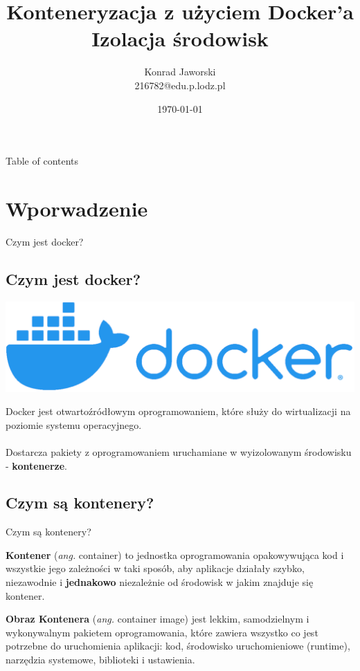 \documentclass[aspectratio=169]{beamer}
\title{Konteneryzacja z użyciem \textbf{Docker}'a \\Izolacja środowisk}
\date{\today}
\author[Jaworski]{Konrad Jaworski\\216782@edu.p.lodz.pl}
\begin{document}
\begin{frame}
    \titlepage
\end{frame}

\begin{frame}{Table of contents}
    \begin{card}
        \tableofcontents
    \end{card}
\end{frame}

\section{Wporwadzenie}
\begin{frame}{Czym jest docker?}\subsection{Czym jest docker?}

    \centering
    \includegraphics[scale=0.2]{img/logo.png}
    \bigskip

    \begin{card}
        Docker jest otwartoźródłowym oprogramowaniem, które służy do wirtualizacji na poziomie systemu operacyjnego.\\\\
        Dostarcza pakiety z oprogramowaniem uruchamiane w wyizolowanym środowisku - \textbf{kontenerze}.
    \end{card}
\end{frame}




\subsection{Czym są kontenery?}
\begin{frame}{Czym są kontenery?}
    \begin{card}
        \textbf{Kontener} (\textit{ang.} container) to jednostka oprogramowania opakowywująca kod i wszystkie jego zależności w taki sposób, aby aplikacje działały szybko, niezawodnie i \textbf{jednakowo} niezależnie od środowisk w jakim znajduje się kontener.
    \end{card}

    \begin{card}
        \textbf{Obraz Kontenera} (\textit{ang.} container image) jest lekkim, samodzielnym i wykonywalnym pakietem oprogramowania, które zawiera wszystko co jest potrzebne do uruchomienia aplikacji: kod,
        środowisko uruchomieniowe (runtime), narzędzia systemowe, biblioteki i ustawienia.
    \end{card}
\end{frame}
\end{document}
